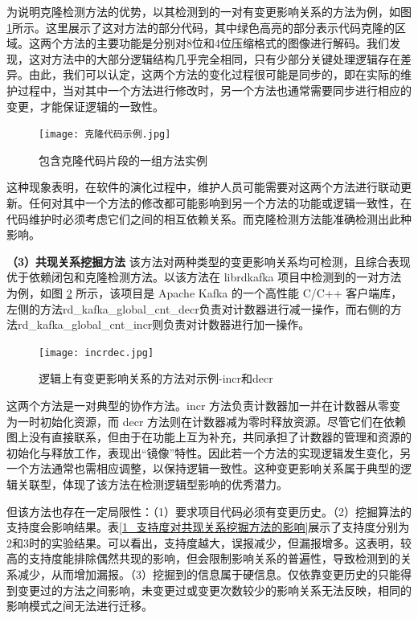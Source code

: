 为说明克隆检测方法的优势，以其检测到的一对有变更影响关系的方法为例，如图\ref{1_包含克隆代码片段的一组方法实例}所示。这里展示了这对方法的部分代码，其中绿色高亮的部分表示代码克隆的区域。这两个方法的主要功能是分别对8位和4位压缩格式的图像进行解码。我们发现，这对方法中的大部分逻辑结构几乎完全相同，只有少部分关键处理逻辑存在差异。由此，我们可以认定，这两个方法的变化过程很可能是同步的，即在实际的维护过程中，当对其中一个方法进行修改时，另一个方法也通常需要同步进行相应的变更，才能保证逻辑的一致性。

\begin{figure}[h]
\centering
\texttt{[image: 克隆代码示例.jpg]}
\caption{包含克隆代码片段的一组方法实例}
\label{1_包含克隆代码片段的一组方法实例}
\end{figure}

这种现象表明，在软件的演化过程中，维护人员可能需要对这两个方法进行联动更新。任何对其中一个方法的修改都可能影响到另一个方法的功能或逻辑一致性，在代码维护时必须考虑它们之间的相互依赖关系。而克隆检测方法能准确检测出此种影响。

\textbf{（3）共现关系挖掘方法} \hspace{2mm}该方法对两种类型的变更影响关系均可检测，且综合表现优于依赖闭包和克隆检测方法。以该方法在 librdkafka 项目中检测到的一对方法为例，如图 \ref{1_逻辑上有变更影响关系的方法对示例-incr和decr} 所示，该项目是 Apache Kafka 的一个高性能 C/C++ 客户端库，左侧的方法rd\_kafka\_global\_cnt\_decr负责对计数器进行减一操作，而右侧的方法rd\_kafka\_global\_cnt\_incr则负责对计数器进行加一操作。

\begin{figure}[h]
\centering
\texttt{[image: incrdec.jpg]}
\caption{逻辑上有变更影响关系的方法对示例-incr和decr}
\label{1_逻辑上有变更影响关系的方法对示例-incr和decr}
\end{figure}

这两个方法是一对典型的协作方法。incr 方法负责计数器加一并在计数器从零变为一时初始化资源，而 decr 方法则在计数器减为零时释放资源。尽管它们在依赖图上没有直接联系，但由于在功能上互为补充，共同承担了计数器的管理和资源的初始化与释放工作，表现出“镜像”特性。因此若一个方法的实现逻辑发生变化，另一个方法通常也需相应调整，以保持逻辑一致性。这种变更影响关系属于典型的逻辑关联型，体现了该方法在检测逻辑型影响的优秀潜力。

但该方法也存在一定局限性：（1）要求项目代码必须有变更历史。（2）挖掘算法的支持度会影响结果。表\ref{1_支持度对共现关系挖掘方法的影响}展示了支持度分别为2和3时的实验结果。可以看出，支持度越大，误报减少，但漏报增多。这表明，较高的支持度能排除偶然共现的影响，但会限制影响关系的普遍性，导致检测到的关系减少，从而增加漏报。（3）挖掘到的信息属于硬信息。仅依靠变更历史的只能得到变更过的方法之间影响，未变更过或变更次数较少的影响关系无法反映，相同的影响模式之间无法进行迁移。
        
